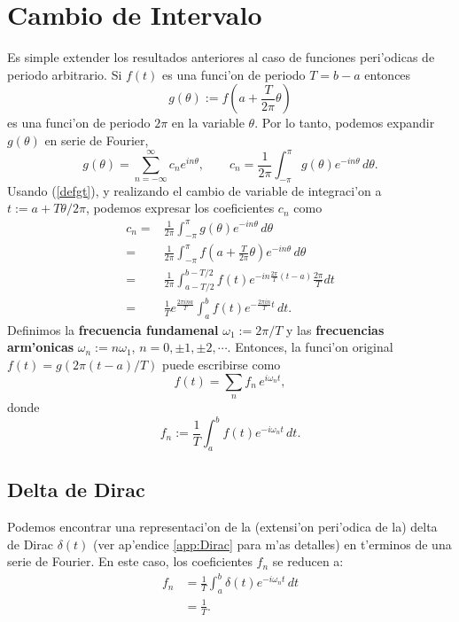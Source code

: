 \section{Cambio de Intervalo}
Es simple extender los resultados anteriores al caso de funciones peri'odicas de periodo arbitrario. Si $f(t)$ es una funci'on de periodo $T=b-a$ entonces
\begin{equation}\label{defgt}
g(\theta):=f(a+\frac{T}{2\pi}\theta)
\end{equation}
es una funci'on de periodo $2\pi$ en la variable $\theta$. Por lo tanto, podemos expandir $g(\theta)$ en serie de Fourier,
\begin{equation}\label{sfgt}
g(\theta)=\sum_{n=-\infty}^\infty c_n e^{i n\theta}, \qquad c_n =\frac{1}{2\pi}\int_{-\pi}^\pi g(\theta) e^{-in\theta}\,d\theta .
\end{equation}
Usando (\ref{defgt}), y realizando el cambio de variable de integraci'on a $t:=a+T\theta/2\pi$,  podemos expresar los coeficientes $c_n$ como
\begin{align}
c_n =& \frac{1}{2\pi}\int_{-\pi}^\pi g(\theta) e^{-in\theta}\,d\theta  \\
=& \frac{1}{2\pi}\int_{-\pi}^\pi f(a+\frac{T}{2\pi}\theta) e^{-in\theta}\,d\theta \\
=& \frac{1}{2\pi}\int_{a-T/2}^{b-T/2} f(t) e^{-in\frac{2\pi}{T}(t-a)}\frac{2\pi}{T}dt \\
=& \frac{1}{T}e^{\frac{2\pi ina}{T}}\int_a^b f(t) e^{-\frac{2\pi i n}{T}t}\,dt.
\end{align}
Definimos la \textbf{frecuencia fundamenal} $\omega_1:=2\pi/T$ y las \textbf{frecuencias arm'onicas} $\omega_n:=n\omega_1$, $n=0,\pm 1, \pm 2, \cdots$. Entonces, la funci'on original $f(t)=g(2\pi(t-a)/T)$ puede escribirse como
\begin{equation}\label{ftpT}
\boxed{f(t)=\sum_n f_n\, e^{i\omega_n t},}
\end{equation}
donde
\begin{equation}\label{fnpT}
\boxed{f_n:=\frac{1}{T}\int_a^b f(t) e^{-i\omega_n t}\,dt.}
\end{equation}

\subsection{Delta de Dirac}
Podemos encontrar una representaci'on de la (extensi'on peri'odica de la) delta de Dirac $\delta(t)$ (ver ap'endice \ref{app:Dirac} para m'as detalles) en t'erminos de una serie de Fourier. En este caso, los coeficientes $f_n$ se reducen a:
\begin{align}
f_n &= \frac{1}{T}\int_a^b \delta(t) e^{-i\omega_n t}\,dt \\
&= \frac{1}{T}.
\end{align}

